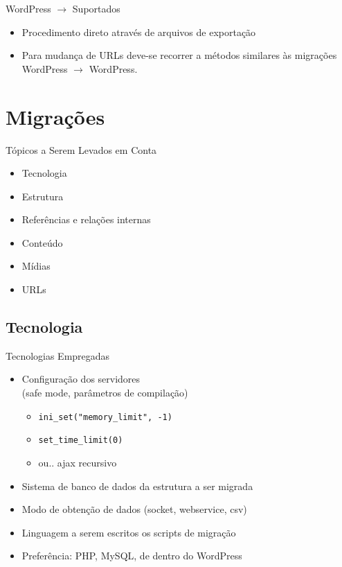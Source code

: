 \documentclass{beamer}
\begin{document}
\begin{frame}{WordPress $\rightarrow$ Suportados}
\begin{itemize}
  \item Procedimento direto através de arquivos de exportação
  \pause \item Para mudança de URLs deve-se recorrer a métodos
        similares às migrações WordPress $\rightarrow$ WordPress.
\end{itemize}
\end{frame}


\section{Migrações}

\begin{frame}{Tópicos a Serem Levados em Conta}
  \begin{itemize}
    \pause \item Tecnologia
    \pause \item Estrutura
    \pause \item Referências e relações internas
    \pause \item Conteúdo
    \pause \item Mídias
    \pause \item URLs
  \end{itemize}
\end{frame}

\subsection{Tecnologia}

\begin{frame}{Tecnologias Empregadas}
  \begin{itemize}
    \pause \item Configuração dos servidores\pause \\
                 (safe mode, parâmetros de compilação)
    \begin{itemize}
      \pause \item \texttt{ini\_set("memory\_limit", -1)}
      \pause \item \texttt{set\_time\_limit(0)}
      \pause \item ou.. \pause ajax recursivo
    \end{itemize}
    \pause \item Sistema de banco de dados da estrutura a ser migrada
    \pause \item Modo de obtenção de dados (socket, webservice, csv)
    \pause \item Linguagem a serem escritos os scripts de migração
    \pause \item Preferência: \pause PHP\pause, MySQL\pause, de dentro
                 do WordPress
  \end{itemize}
\end{frame}
\end{document}
